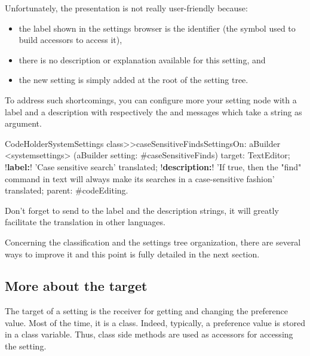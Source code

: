 \documentclass[a4paper,10pt,twoside]{book}
\begin{document}
Unfortunately, the presentation is not really user-friendly because:
\begin{itemize}
\item the label shown in the settings browser is the identifier (the symbol used to build accessors to access it),
\item there is no description or explanation available for this setting, and
\item the new setting is simply added at the root of the setting tree. 
\end{itemize}

To address such shortcomings, you can configure more your setting node with a label and a description with respectively the  and  messages which take a string as argument. 

\begin{code}{}
CodeHolderSystemSettings class>>caseSensitiveFindsSettingsOn: aBuilder
	<systemsettings>
	(aBuilder setting: #caseSensitiveFinds) 
		target: TextEditor;
		!\textbf{label:}! 'Case sensitive search' translated;
		!\textbf{description:}! 'If true, then the "find" command in text will always make its searches in a case-sensitive fashion' translated;
		parent: #codeEditing.
\end{code}

Don't forget to send  to the label and the description strings, it will greatly facilitate the translation in other languages.

Concerning the classification and the settings tree organization, there are several ways to improve it and this point is fully detailed in the next section.

\subsection{More about the target}
The target of a setting is the receiver for getting and changing the preference value. Most of the time, it is a class. Indeed, typically, a preference value is stored in a class variable. Thus, class side methods are used as accessors for accessing the setting. 
\end{document}
